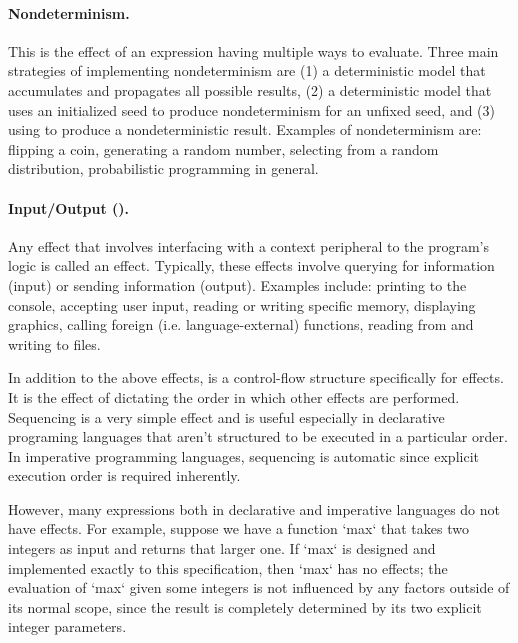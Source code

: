 \paragraph{Nondeterminism.}
This is the effect of an expression having multiple ways to evaluate.
Three main strategies of implementing nondeterminism are
(1) a deterministic model that accumulates and propagates all possible results,
(2) a deterministic model that uses an initialized seed to produce nondeterminism for an unfixed seed, and
(3) using \IO to produce a nondeterministic result.
Examples of nondeterminism are: flipping a coin, generating a random number, selecting from a random distribution, probabilistic programming in general.

\paragraph{Input/Output (\IO).}
Any effect that involves interfacing with a context peripheral to the program's logic is called an \IO effect.
Typically, these effects involve querying for information (input) or sending information (output).
Examples include: printing to the console, accepting user input, reading or writing specific memory, displaying graphics, calling foreign (i.e. language-external) functions, reading from and writing to files.

\newparagraph
In addition to the above effects,  is a control-flow structure specifically for effects.
It is the effect of dictating the order in which other effects are performed.
Sequencing is a very simple effect and is useful especially in declarative programing languages that aren't structured to be executed in a particular order.
In imperative programming languages, sequencing is automatic since explicit execution order is required inherently.

However, many expressions both in declarative and imperative languages do not have effects.
For example, suppose we have a function \code`max` that takes two integers as input and returns that larger one.
If \code`max` is designed and implemented exactly to this specification, then \code`max` has no effects; the evaluation of \code`max` given some integers is not influenced by any factors outside of its normal scope, since the result is completely determined by its two explicit integer parameters.

